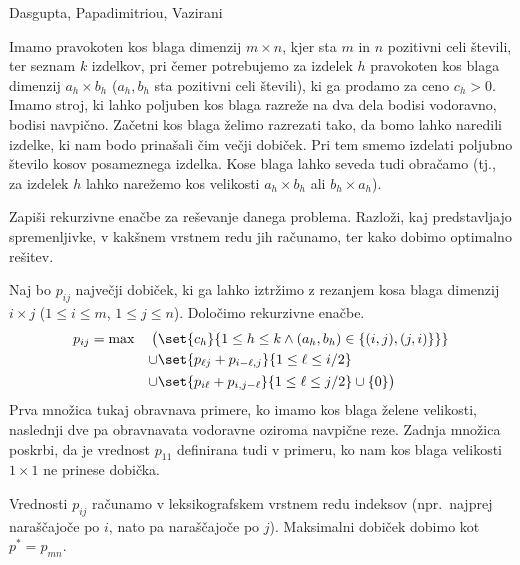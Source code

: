\begin{naloga}%
{Dasgupta, Papadimitriou, Vazirani}{\cite[Exercise~6.14]{dpv}}
\begin{vprasanje}
Imamo pravokoten kos blaga dimenzij $m \times n$,
kjer sta $m$ in $n$ pozitivni celi števili,
ter seznam $k$ izdelkov,
pri čemer potrebujemo za izdelek $h$
pravokoten kos blaga dimenzij $a_h \times b_h$
($a_h, b_h$ sta pozitivni celi števili),
ki ga prodamo za ceno $c_h > 0$.
Imamo stroj, ki lahko poljuben kos blaga razreže na dva dela
bodisi vodoravno, bodisi navpično.
Začetni kos blaga želimo razrezati tako,
da bomo lahko naredili izdelke,
ki nam bodo prinašali čim večji dobiček.
Pri tem smemo izdelati poljubno število kosov posameznega izdelka.
Kose blaga lahko seveda tudi obračamo
(tj., za izdelek $h$ lahko narežemo kos velikosti
$a_h \times b_h$ ali $b_h \times a_h$).

Zapiši rekurzivne enačbe za reševanje danega problema.
Razloži, kaj predstavljajo spremenljivke,
v kakšnem vrstnem redu jih računamo,
ter kako dobimo optimalno rešitev.
\end{vprasanje}

\begin{odgovor}
Naj bo $p_{ij}$ največji dobiček,
ki ga lahko iztržimo z rezanjem kosa blaga dimenzij $i \times j$
($1 \le i \le m$, $1 \le j \le n$).
Določimo rekurzivne enačbe.
\begin{alignat*}{3}
p_{ij} &= \max
& \big( &{} \set{c_h}{1 \le h \le k \land (a_h, b_h) \in \{(i, j), (j, i)\}\}} \\
&& \cup &{} \set{p_{\ell j} + p_{i-\ell, j}}{1 \le \ell \le i/2} \\
&& \cup &{} \set{p_{i \ell} + p_{i, j-\ell}}{1 \le \ell \le j/2} \cup \{0\}\big)
\end{alignat*}
Prva množica tukaj obravnava primere, ko imamo kos blaga želene velikosti,
naslednji dve pa obravnavata vodoravne oziroma navpične reze.
Zadnja množica poskrbi, da je vrednost $p_{11}$ definirana tudi v primeru,
ko nam kos blaga velikosti $1 \times 1$ ne prinese dobička.

Vrednosti $p_{ij}$ računamo v leksikografskem vrstnem redu indeksov
(npr.~najprej naraščajoče po $i$, nato pa naraščajoče po $j$).
Maksimalni dobiček dobimo kot $p^* = p_{mn}$.
\end{odgovor}
\end{naloga}
